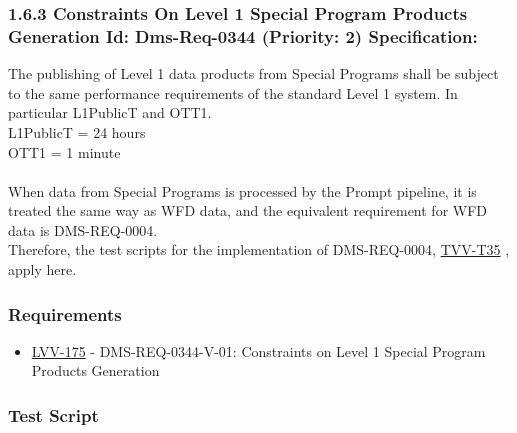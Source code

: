 \hypertarget{constraints-on-level-1-special-program-products-generation-id-dms-req-0344-priority-2-specification}{%
\subsubsection{1.6.3 Constraints On Level 1 Special Program Products
Generation Id: Dms-Req-0344 (Priority: 2)
Specification:}\label{constraints-on-level-1-special-program-products-generation-id-dms-req-0344-priority-2-specification}}

The publishing of Level 1 data products from Special Programs shall be
subject to the same performance requirements of the standard Level 1
system. In particular L1PublicT and OTT1.\\
L1PublicT = 24 hours\\
OTT1 = 1 minute\\
~\\
When data from Special Programs is processed by the Prompt pipeline, it
is treated the same way as WFD data, and the equivalent requirement for
WFD data is DMS-REQ-0004.\\
Therefore, the test scripts for the implementation of DMS-REQ-0004,
\href{https://jira.lsstcorp.org/secure/Tests.jspa\#/testCase/LVV-T35}{TVV-T35}
, apply here.

\hypertarget{requirements-72}{%
\subsubsection{Requirements}\label{requirements-72}}

\begin{itemize}
\tightlist
\item
  \href{https://jira.lsstcorp.org/browse/LVV-175}{LVV-175} -
  DMS-REQ-0344-V-01: Constraints on Level 1 Special Program Products
  Generation
\end{itemize}

\hypertarget{test-script-72}{%
\subsubsection{Test Script}\label{test-script-72}}

